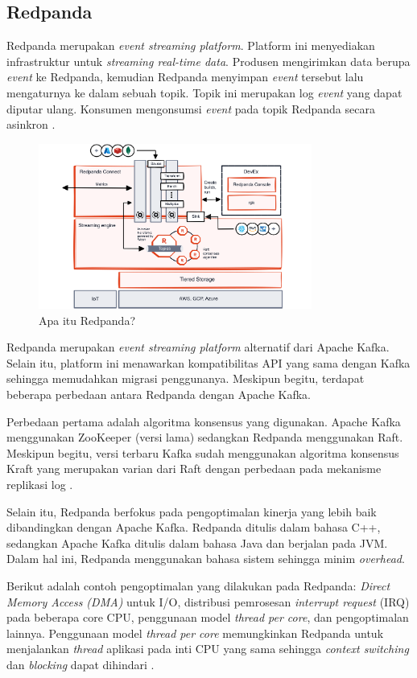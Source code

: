 \subsection{Redpanda}

Redpanda merupakan \textit{event streaming platform}. Platform ini menyediakan infrastruktur untuk \textit{streaming real-time data}. Produsen mengirimkan data berupa \textit{event} ke Redpanda, kemudian Redpanda menyimpan \textit{event} tersebut lalu mengaturnya ke dalam sebuah topik. Topik ini merupakan log \textit{event} yang dapat diputar ulang. Konsumen mengonsumsi \textit{event} pada topik Redpanda secara asinkron \parencite{redpandaIntro}.

\begin{figure}[htbp]
    \centering
    \includegraphics[width=0.8\textwidth]{resources/chapter-2/redpanda.png}
    \caption{Apa itu Redpanda? \parencite{whatIsRedpanda}}
    \label{fig:what-is-redpanda}
\end{figure}

Redpanda merupakan \textit{event streaming platform} alternatif dari Apache Kafka. Selain itu, platform ini menawarkan kompatibilitas API yang sama dengan Kafka sehingga memudahkan migrasi penggunanya. Meskipun begitu, terdapat beberapa perbedaan antara Redpanda dengan Apache Kafka.

Perbedaan pertama adalah algoritma konsensus yang digunakan. Apache Kafka menggunakan ZooKeeper (versi lama) sedangkan Redpanda menggunakan Raft. Meskipun begitu, versi terbaru Kafka sudah menggunakan algoritma konsensus Kraft yang merupakan varian dari Raft dengan perbedaan pada mekanisme replikasi log \parencite{raftKraft}.

Selain itu, Redpanda berfokus pada pengoptimalan kinerja yang lebih baik dibandingkan dengan Apache Kafka. Redpanda ditulis dalam bahasa C++, sedangkan Apache Kafka ditulis dalam bahasa Java dan berjalan pada JVM. Dalam hal ini, Redpanda menggunakan bahasa sistem sehingga minim \textit{overhead}.

Berikut adalah contoh pengoptimalan yang dilakukan pada Redpanda: \textit{Direct Memory Access (DMA)} untuk I/O, distribusi pemrosesan \textit{interrupt request} (IRQ) pada beberapa core CPU, penggunaan model \textit{thread per core}, dan pengoptimalan lainnya. Penggunaan model \textit{thread per core} memungkinkan Redpanda untuk menjalankan \textit{thread} aplikasi pada inti CPU yang sama sehingga \textit{context switching} dan \textit{blocking} dapat dihindari \parencite{redpandaArchitecture}.